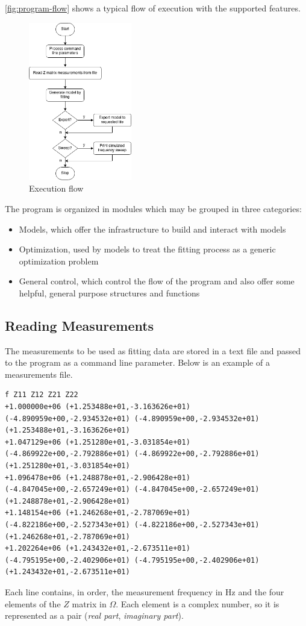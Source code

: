 \autoref{fig:program-flow} shows a typical flow of execution with the supported features.
\begin{figure}[htbp]
    \center
    \includegraphics[width = 0.4\textwidth]{img/program-flowchart}
    \caption{Execution flow}
    \label{fig:program-flow}
\end{figure}
The program is organized in modules which may be grouped in three categories:
\begin{itemize}
    \item Models, which offer the infrastructure to build and interact with models
    \item Optimization, used by models to treat the fitting process as a generic optimization problem
    \item General control, which control the flow of the program and also offer some helpful, general purpose structures and functions
\end{itemize}

\subsection{Reading Measurements}
The measurements to be used as fitting data are stored in a text file and passed to the program as a command line parameter. Below is an example of a measurements file.
\begin{lstlisting}[backgroundcolor=\color{white},basicstyle=\tiny,breaklines=true]
f Z11 Z12 Z21 Z22
+1.000000e+06 (+1.253488e+01,-3.163626e+01) (-4.890959e+00,-2.934532e+01) (-4.890959e+00,-2.934532e+01) (+1.253488e+01,-3.163626e+01)
+1.047129e+06 (+1.251280e+01,-3.031854e+01) (-4.869922e+00,-2.792886e+01) (-4.869922e+00,-2.792886e+01) (+1.251280e+01,-3.031854e+01)
+1.096478e+06 (+1.248878e+01,-2.906428e+01) (-4.847045e+00,-2.657249e+01) (-4.847045e+00,-2.657249e+01) (+1.248878e+01,-2.906428e+01)
+1.148154e+06 (+1.246268e+01,-2.787069e+01) (-4.822186e+00,-2.527343e+01) (-4.822186e+00,-2.527343e+01) (+1.246268e+01,-2.787069e+01)
+1.202264e+06 (+1.243432e+01,-2.673511e+01) (-4.795195e+00,-2.402906e+01) (-4.795195e+00,-2.402906e+01) (+1.243432e+01,-2.673511e+01)
\end{lstlisting}
Each line contains, in order, the measurement frequency in Hz and the four elements of the $Z$ matrix in $\Omega$. Each element is a complex number, so it is represented as a pair (\textit{real part}, \textit{imaginary part}).


